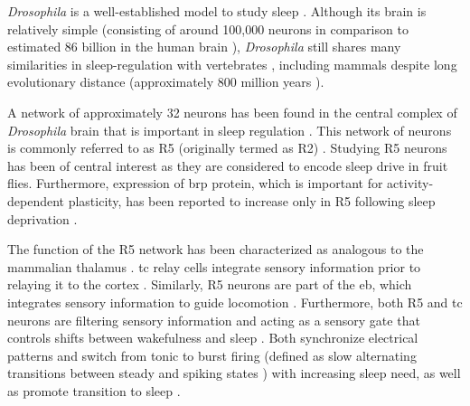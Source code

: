 \documentclass[../main.tex]{subfiles}
\begin{document}
\textit{Drosophila} is a well-established model to study sleep 
\parencite{liuSleepDriveEncoded2016,andreaniCircadianProgrammingEllipsoid2022,shaferRegulationDrosophilaSleep2021,dubowyCircadianRhythmsSleep2017}.
Although its brain is relatively simple (consisting of around 100,000 neurons \parencite{donleaRecurrentCircuitryBalancing2018} in comparison to
estimated 86 billion in the human brain \parencite{herculano-houzelRemarkableNotExtraordinary2012}), \textit{Drosophila} still
shares many similarities in sleep-regulation with vertebrates \parencite{liuSleepDriveEncoded2016}, including
mammals \parencite{suarez-grimaltNeuralArchitectureSleep2021,dubowyCircadianRhythmsSleep2017} despite long
evolutionary distance (approximately 800 million years \parencite{williamsLongReachNAAG2021}).

A network of approximately 32 neurons has been found in the central complex of \textit{Drosophila} brain that is important in sleep regulation \parencite{liuSleepDriveEncoded2016,raccugliaNetworkSpecificSynchronizationElectrical2019}. This network of neurons is commonly referred to as R5 (originally termed as R2) \parencite{raccugliaNetworkSpecificSynchronizationElectrical2019}. Studying R5 neurons has been of central interest as they are considered to encode sleep drive in fruit flies. Furthermore, expression of \gls{brp} protein, which is important for activity-dependent plasticity, has been reported to increase only in R5 following sleep deprivation \parencite{liuSleepDriveEncoded2016}.

The function of the R5 network has been characterized as analogous to the mammalian thalamus
\parencite{suarez-grimaltNeuralArchitectureSleep2021,raccugliaNetworkSpecificSynchronizationElectrical2019}.
\gls{tc} relay cells integrate sensory information prior to relaying it to the cortex \parencite{sampathkumarIntegrationSignalsDifferent2021}.
Similarly, R5 neurons are part of the \gls{eb}, which integrates sensory information to guide locomotion \parencite{yanSubtypeSpecificRolesEllipsoid2023}. 
Furthermore, both R5 and \gls{tc} neurons are filtering sensory information and acting as a
sensory gate that controls shifts between wakefulness and sleep
\parencite{raccugliaCoherentMultilevelNetwork2022,gentThalamicDualControl2018}. Both
synchronize electrical patterns and switch from tonic to burst firing (defined as slow alternating transitions between steady and spiking states
\parencite{rinzelFormalClassificationBursting1987}) with increasing sleep need, as well as promote transition to sleep
\parencite{suarez-grimaltNeuralArchitectureSleep2021, raccugliaNetworkSpecificSynchronizationElectrical2019}.
\end{document}
